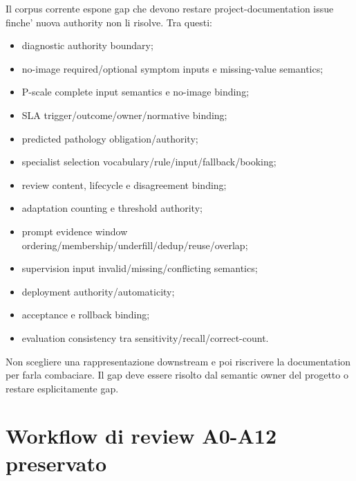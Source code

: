 \documentclass[11pt,a4paper]{article}
\begin{document}
Il corpus corrente espone gap che devono restare project-documentation issue finche' nuova authority non li risolve. Tra questi:
\begin{itemize}
\item diagnostic authority boundary;
\item no-image required/optional symptom inputs e missing-value semantics;
\item P-scale complete input semantics e no-image binding;
\item SLA trigger/outcome/owner/normative binding;
\item predicted pathology obligation/authority;
\item specialist selection vocabulary/rule/input/fallback/booking;
\item review content, lifecycle e disagreement binding;
\item adaptation counting e threshold authority;
\item prompt evidence window ordering/membership/underfill/dedup/reuse/overlap;
\item supervision input invalid/missing/conflicting semantics;
\item deployment authority/automaticity;
\item acceptance e rollback binding;
\item evaluation consistency tra sensitivity/recall/correct-count.
\end{itemize}

\begin{ddtaanti}[title={Gap-to-BA shortcut vietata}]
Non scegliere una rappresentazione downstream e poi riscrivere la documentation per farla combaciare. Il gap deve essere risolto dal semantic owner del progetto o restare esplicitamente gap.
\end{ddtaanti}

\section{Workflow di review A0-A12 preservato}
\closedtag
\end{document}
